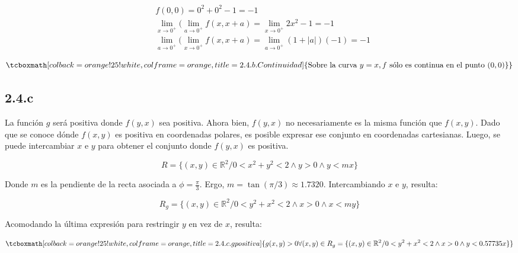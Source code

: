 \documentclass{article}
\renewcommand{\Bbb}{\mathbb}
\begin{document}
\begin{subequations}
\begin{align}
& f(0, 0) = 0^2 + 0^2 - 1 = -1 \\
& \lim_{x \rightarrow 0^+} ( \lim_{a \rightarrow 0^+} f(x, x+a) = \lim_{x \rightarrow 0^+} 2x^2 - 1 = -1 \\
& \lim_{a \rightarrow 0^+} ( \lim_{x \rightarrow 0^+} f(x, x+a) = \lim_{a \rightarrow 0^+} (1 + |a|) (-1) = -1
\end{align}
\end{subequations}

\begin{equation}
\tcboxmath[colback=orange!25!white,colframe=orange,title=2.4.b. Continuidad]
{ \text{Sobre la curva } y = x, f \text{ sólo es continua en el punto } (0, 0) \} }
\end{equation}

\subsection*{2.4.c}
\label{subsec:2.4.c}

La función $g$ será positiva donde $f(y,x)$ sea positiva. Ahora bien, $f(y,x)$ no necesariamente es la misma función que $f(x,y)$. Dado que se conoce dónde $f(x,y)$ es positiva en coordenadas polares, es posible expresar ese conjunto en coordenadas cartesianas. Luego, se puede intercambiar $x$ e $y$ para obtener el conjunto donde $f(y,x)$ es positiva. 

\begin{equation}
R = \{ (x,y) \in \Bbb R^2 / 0 < x^2 + y^2 < 2 \wedge y > 0 \wedge y < m x \}
\end{equation}

Donde $m$ es la pendiente de la recta asociada a $\phi = \frac{\pi}{3}$. Ergo, $m = \tan(\pi/3) \approx 1.7320$. Intercambiando $x$ e $y$, resulta:

\begin{equation}
R_g = \{ (x,y) \in \Bbb R^2 / 0 < y^2 + x^2 < 2 \wedge x > 0 \wedge x < m y \}
\end{equation}

Acomodando la última expresión para restringir $y$ en vez de $x$, resulta:

\begin{equation}
\tcboxmath[colback=orange!25!white,colframe=orange,title=2.4.c. g positiva ]
{
 g(x,y) > 0 \forall (x,y) \in R_g = \{ (x,y) \in \Bbb R^2 / 0 < y^2 + x^2 < 2 \wedge x > 0 \wedge y < 0.57735 x \} 
}
\end{equation}
\end{document}
